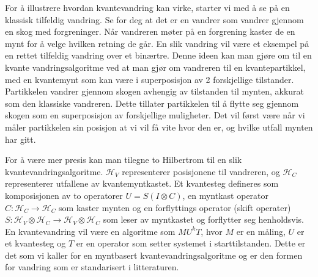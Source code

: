 

    For å illustrere hvordan kvantevandring kan virke, starter vi med å se på en klassisk tilfeldig vandring. Se for deg at det er en vandrer som vandrer gjennom en skog med forgreninger. Når vandreren møter på en forgrening kaster de en mynt for å velge hvilken retning de går. En slik vandring vil være et eksempel på en rettet tilfeldig vandring over et binærtre. Denne ideen kan man gjøre om til en kvante vandringsalgoritme ved at man gjør om vandreren til en kvantepartikkel, med en kvantemynt som kan være i superposisjon av 2 forskjellige tilstander. Partikkelen vandrer gjennom skogen avhengig av tilstanden til mynten, akkurat som den klassiske vandreren. Dette tillater partikkelen til å flytte seg gjennom skogen som en superposisjon av forskjellige muligheter. Det vil først være når vi måler partikkelen sin posisjon at vi vil få vite hvor den er, og hvilke utfall mynten har gitt.

    For å være mer presis kan man tilegne to Hilbertrom til en slik kvantevandringsalgoritme. $\mathcal{H}_V$ representerer posisjonene til vandreren, og $\mathcal{H}_C$ representerer utfallene av kvantemyntkastet. Et kvantesteg defineres som komposisjonen av to operatorer $U=S(I\otimes C)$, en myntkast operator $C:\mathcal{H}_C\rightarrow\mathcal{H}_C$ som kaster mynten og en forflyttings operator (skift operater) $S:\mathcal{H}_V\otimes\mathcal{H}_C\rightarrow\mathcal{H}_V\otimes\mathcal{H}_C$ som leser av myntkastet og forflytter seg henholdsvis. En kvantevandring vil være en algoritme som $MU^kT$, hvor $M$ er en måling, $U$ er et kvantesteg og $T$ er en operator som setter systemet i starttilstanden. Dette er det som vi kaller for en myntbasert kvantevandringsalgoritme og er den formen for vandring som er standarisert i litteraturen.


